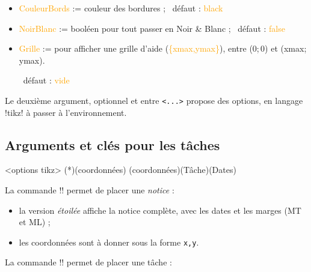 \documentclass[french,a4paper,11pt]{article}
\newcommand\Cle[1]{{\small\sffamily\textlangle \textcolor{orange}{#1}\textrangle}}
\begin{document}
{\begin{tipblock}
\begin{itemize}
	\hfill~défaut : \Cle{teal/red}
	\item \Cle{CouleurBords} := couleur des bordures ; \hfill~défaut : \Cle{black}
	\item \Cle{NoirBlanc} := booléen pour tout passer en Noir \&{} Blanc ; \hfill~défaut : \Cle{false}
	\item \Cle{Grille} := pour afficher une grille d'aide (\Cle{\{xmax,ymax\}}), entre (0;\,0) et (xmax;\,ymax).
	
	\hfill~défaut : \Cle{vide}
\end{itemize}

Le deuxième argument, optionnel et entre \texttt{<...>} propose des options, en langage \packagetex!tikz! à passer à l'environnement.
\end{tipblock}

\begin{DemoCode}[]
\begin{GrapheMPM}[Grille={14,5}]
\end{GrapheMPM}
\end{DemoCode}

\pagebreak

\subsection{Arguments et clés pour les tâches}

\begin{DemoCode}
\begin{GrapheMPM}[clés]<options tikz>
	\MPMPlaceNotice(*)(coordonnées)
	\MPMPlaceTache(coordonnées)(Tâche)(Dates)
\end{GrapheMPM}
\end{DemoCode}

\begin{tipblock}
La commande \motcletex!\MPMPlaceNotice! permet de placer une \textit{notice} :

\begin{itemize}
	\item la version \textit{étoilée} affiche la notice complète, avec les dates et les marges (MT et ML) ;
	\item les coordonnées sont à donner sous la forme \verb!x,y!.
\end{itemize}
\vspace*{-\baselineskip}\leavevmode
\end{tipblock}

\begin{tipblock}
La commande \motcletex!\MPMPlaceTache! permet de placer une tâche :


\end{tipblock}}
\end{document}
